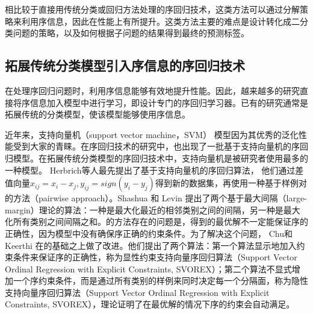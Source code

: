 相比较于直接用传统分类或回归方法处理的序回归技术，这类方法可以通过分解策略来利用序信息，因此在性能上有所提升。这类方法主要的难点是设计转化成二分类问题的策略，以及如何根据子问题的结果得到最终的预测标签。

\subsection{拓展传统分类模型引入序信息的序回归技术}
在处理序回归问题时，利用序信息能够有效地提升性能。因此，越来越多的研究直接将序信息加入模型中进行学习，即设计专门的序回归学习器。已有的研究通常是拓展传统的分类模型，使该模型能够使用序信息。

近年来，支持向量机（support vector machine，SVM\citep{cortes1995support}）
模型因为其优秀的泛化性能受到大家的青睐。在序回归技术的研究中，也出现了一批基于支持向量机的序回归模型。在拓展传统分类模型的序回归技术中，支持向量机是被研究者使用最多的一种模型。 Herbrich等人\citep{herbrich1999support}\citep{herbrich1999large}最先提出了基于支持向量机的序回归算法，
他们通过差值向量\(x_{ij} = x_{i}-x_{j}, y_{ij} = sign(y_{i} - y_{j})\)得到新的数据集，再使用一种基于样例对的方法（pairwise approach）。Shashua 和 Levin\citep{shashua2002ranking}
提出了两个基于最大间隔（large-margin）理论的算法：一种是最大化最近的相邻类别之间的间隔，另一种是最大化所有类别之间间隔之和。\citep{shashua2002ranking}的方法存在的问题是，得到的最优解不一定能保证序的正确性，因为模型中没有确保序正确的约束条件。为了解决这个问题， Chu和Keerthi\citep{chu2007support}\citep{chu2005new}
在\citep{shashua2002ranking}的基础之上做了改进。他们提出了两个算法：第一个算法显示地加入约束条件来保证序的正确性，称为显性约束支持向量序回归算法（Support Vector Ordinal Regression with Explicit Constraints, SVOREX）；第二个算法不显式增加一个序约束条件，而是通过所有类别的样例来同时决定每一个分隔面，称为隐性支持向量序回归算法（Support Vector Ordinal Regression with Explicit Constraints, SVOREX），\citep{chu2007support}理论证明了在最优解的情况下序的约束会自动满足。


